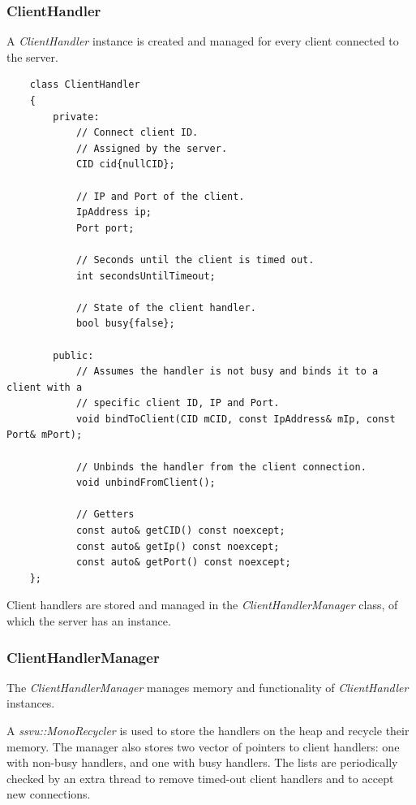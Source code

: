 \documentclass{report}
\def \cppStart {\begin{verbatim}}
\begin{document}
                \subsubsection{ClientHandler}

                    A \emph{ClientHandler} instance is created and managed for every client connected to the server.

\cppStart
    class ClientHandler
    {
        private:
            // Connect client ID. 
            // Assigned by the server.
            CID cid{nullCID};

            // IP and Port of the client.
            IpAddress ip;
            Port port;

            // Seconds until the client is timed out.
            int secondsUntilTimeout;
            
            // State of the client handler.
            bool busy{false};

        public:
            // Assumes the handler is not busy and binds it to a client with a
            // specific client ID, IP and Port.
            void bindToClient(CID mCID, const IpAddress& mIp, const Port& mPort);

            // Unbinds the handler from the client connection.
            void unbindFromClient();

            // Getters
            const auto& getCID() const noexcept;
            const auto& getIp() const noexcept;
            const auto& getPort() const noexcept;
    };
\end{verbatim}

                    Client handlers are stored and managed in the \emph{ClientHandlerManager} class, of which the server has an instance.

                \subsubsection{ClientHandlerManager}

                    The \emph{ClientHandlerManager} manages memory and functionality of \emph{ClientHandler} instances.
                    
                    A \emph{ssvu::MonoRecycler} is used to store the handlers on the heap and recycle their memory.
                    The manager also stores two vector of pointers to client handlers: one with non-busy handlers, and one with busy handlers.
                    The lists are periodically checked by an extra thread to remove timed-out client handlers and to accept new connections.
\end{document}
